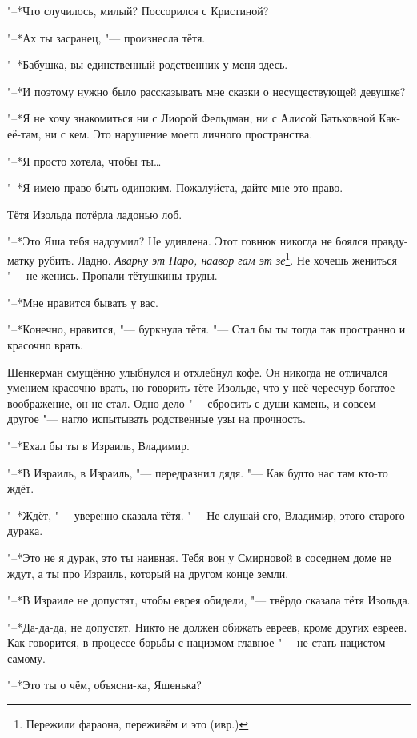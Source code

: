 "--*Что случилось, милый?
Поссорился с Кристиной?

\asterism

"--*Ах ты засранец, "--- произнесла тётя.

"--*Бабушка, вы единственный родственник у меня здесь.

"--*И поэтому нужно было рассказывать мне сказки о несуществующей девушке?

"--*Я не хочу знакомиться ни с Лиорой Фельдман, ни с Алисой Батьковной Как-её-там, ни с кем.
Это нарушение моего личного пространства.

"--*Я просто хотела, чтобы ты\ldots{}

"--*Я имею право быть одиноким.
Пожалуйста, дайте мне это право.

Тётя Изольда потёрла ладонью лоб.

"--*Это Яша тебя надоумил?
Не удивлена.
Этот говнюк никогда не боялся правду-матку рубить.
Ладно.
\textit{Аварну эт Паро, наавор гам эт зе}\footnote{Пережили фараона, переживём и это (ивр.)}.
Не хочешь жениться "--- не женись.
Пропали тётушкины труды.

"--*Мне нравится бывать у вас.

"--*Конечно, нравится, "--- буркнула тётя.
"--- Стал бы ты тогда так пространно и красочно врать.

Шенкерман смущённо улыбнулся и отхлебнул кофе.
Он никогда не отличался умением красочно врать, но говорить тёте Изольде, что у неё чересчур богатое воображение, он не стал.
Одно дело "--- сбросить с души камень, и совсем другое "--- нагло испытывать родственные узы на прочность.

\textspace

"--*Ехал бы ты в Израиль, Владимир.

"--*В Израиль, в Израиль, "--- передразнил дядя.
"--- Как будто нас там кто-то ждёт.

"--*Ждёт, "--- уверенно сказала тётя.
"--- Не слушай его, Владимир, этого старого дурака.

"--*Это не я дурак, это ты наивная.
Тебя вон у Смирновой в соседнем доме не ждут, а ты про Израиль, который на другом конце земли.

"--*В Израиле не допустят, чтобы еврея обидели, "--- твёрдо сказала тётя Изольда.

"--*Да-да-да, не допустят.
Никто не должен обижать евреев, кроме других евреев.
Как говорится, в процессе борьбы с нацизмом главное "--- не стать нацистом самому.

"--*Это ты о чём, объясни-ка, Яшенька?

